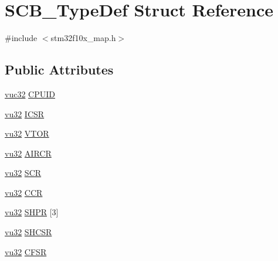 \hypertarget{struct_s_c_b___type_def}{}\section{S\+C\+B\+\_\+\+Type\+Def Struct Reference}
\label{struct_s_c_b___type_def}


{\ttfamily \#include $<$stm32f10x\+\_\+map.\+h$>$}

\subsection*{Public Attributes}
\begin{DoxyCompactItemize}
\item 
\hyperlink{agilefox_2library_2inc_2stm32f10x__type_8h_aafafa689bea126b0ac382c789206f51e}{vuc32} \hyperlink{struct_s_c_b___type_def_a573e25c88528bf57e6102c2f58bfbebb}{C\+P\+U\+ID}
\item 
\hyperlink{agilefox_2library_2inc_2stm32f10x__type_8h_a6e2761f0a1011f84ed96b946f2c8a563}{vu32} \hyperlink{struct_s_c_b___type_def_a8c461c728ecfcfe29386bd9a5451ef70}{I\+C\+SR}
\item 
\hyperlink{agilefox_2library_2inc_2stm32f10x__type_8h_a6e2761f0a1011f84ed96b946f2c8a563}{vu32} \hyperlink{struct_s_c_b___type_def_adadf3af56fc57fb35feec8ca17b94328}{V\+T\+OR}
\item 
\hyperlink{agilefox_2library_2inc_2stm32f10x__type_8h_a6e2761f0a1011f84ed96b946f2c8a563}{vu32} \hyperlink{struct_s_c_b___type_def_a268a81d1a31a92ca3b49c89e715da4d0}{A\+I\+R\+CR}
\item 
\hyperlink{agilefox_2library_2inc_2stm32f10x__type_8h_a6e2761f0a1011f84ed96b946f2c8a563}{vu32} \hyperlink{struct_s_c_b___type_def_a76d72e3b95d53db9a5749ea70d5e28f1}{S\+CR}
\item 
\hyperlink{agilefox_2library_2inc_2stm32f10x__type_8h_a6e2761f0a1011f84ed96b946f2c8a563}{vu32} \hyperlink{struct_s_c_b___type_def_a2060dc4dff7eafec405ff4a3ebdbc6ba}{C\+CR}
\item 
\hyperlink{agilefox_2library_2inc_2stm32f10x__type_8h_a6e2761f0a1011f84ed96b946f2c8a563}{vu32} \hyperlink{struct_s_c_b___type_def_aa059b7c15e155c023556bf6b4ba64809}{S\+H\+PR} \mbox{[}3\mbox{]}
\item 
\hyperlink{agilefox_2library_2inc_2stm32f10x__type_8h_a6e2761f0a1011f84ed96b946f2c8a563}{vu32} \hyperlink{struct_s_c_b___type_def_acf8d2216f847e8c32fdc1d2894846c5d}{S\+H\+C\+SR}
\item 
\hyperlink{agilefox_2library_2inc_2stm32f10x__type_8h_a6e2761f0a1011f84ed96b946f2c8a563}{vu32} \hyperlink{struct_s_c_b___type_def_a6f9fa0acc8876b471a08711905fbe404}{C\+F\+SR}

\end{DoxyCompactItemize}
